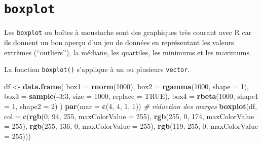\documentclass[
]{book}
\newenvironment{Shaded}{\begin{snugshade}}{\end{snugshade}}
\newcommand{\CommentTok}[1]{\textcolor[rgb]{0.56,0.35,0.01}{\textit{#1}}}
\newcommand{\DataTypeTok}[1]{\textcolor[rgb]{0.13,0.29,0.53}{#1}}
\newcommand{\DecValTok}[1]{\textcolor[rgb]{0.00,0.00,0.81}{#1}}
\newcommand{\KeywordTok}[1]{\textcolor[rgb]{0.13,0.29,0.53}{\textbf{#1}}}
\newcommand{\NormalTok}[1]{#1}
\newcommand{\OperatorTok}[1]{\textcolor[rgb]{0.81,0.36,0.00}{\textbf{#1}}}
\newcommand{\OtherTok}[1]{\textcolor[rgb]{0.56,0.35,0.01}{#1}}
\newcommand{\StringTok}[1]{\textcolor[rgb]{0.31,0.60,0.02}{#1}}
\begin{document}
\hypertarget{graph1boxplot}{%
\section{\texorpdfstring{\texttt{boxplot}}{boxplot}}\label{graph1boxplot}}

Les \texttt{boxplot} ou boîtes à moustache sont des graphiques très courant avec R car ils donnent un bon aperçu d'un jeu de données en représentant les valeurs extrêmes (``outliers''), la médiane, les quartiles, les minimums et les maximums.

La fonction \texttt{boxplot()} s'applique à un ou plusieurs \texttt{vector}.

\begin{Shaded}
\begin{Highlighting}[]
\NormalTok{df <-}\StringTok{ }\KeywordTok{data.frame}\NormalTok{(}
  \DataTypeTok{box1 =} \KeywordTok{rnorm}\NormalTok{(}\DecValTok{1000}\NormalTok{), }
  \DataTypeTok{box2 =} \KeywordTok{rgamma}\NormalTok{(}\DecValTok{1000}\NormalTok{, }\DataTypeTok{shape =} \DecValTok{1}\NormalTok{), }
  \DataTypeTok{box3 =} \KeywordTok{sample}\NormalTok{(}\OperatorTok{-}\DecValTok{3}\OperatorTok{:}\DecValTok{3}\NormalTok{, }\DataTypeTok{size =} \DecValTok{1000}\NormalTok{, }\DataTypeTok{replace =} \OtherTok{TRUE}\NormalTok{),}
  \DataTypeTok{box4 =} \KeywordTok{rbeta}\NormalTok{(}\DecValTok{1000}\NormalTok{, }\DataTypeTok{shape1 =} \DecValTok{1}\NormalTok{, }\DataTypeTok{shape2 =} \DecValTok{2}\NormalTok{)}
\NormalTok{)}
\KeywordTok{par}\NormalTok{(}\DataTypeTok{mar =} \KeywordTok{c}\NormalTok{(}\DecValTok{4}\NormalTok{, }\DecValTok{4}\NormalTok{, }\DecValTok{1}\NormalTok{, }\DecValTok{1}\NormalTok{)) }\CommentTok{# réduction des marges}
\KeywordTok{boxplot}\NormalTok{(df, }\DataTypeTok{col =} \KeywordTok{c}\NormalTok{(}\KeywordTok{rgb}\NormalTok{(}\DecValTok{0}\NormalTok{, }\DecValTok{94}\NormalTok{, }\DecValTok{255}\NormalTok{, }\DataTypeTok{maxColorValue =} \DecValTok{255}\NormalTok{),  }
  \KeywordTok{rgb}\NormalTok{(}\DecValTok{255}\NormalTok{, }\DecValTok{0}\NormalTok{, }\DecValTok{174}\NormalTok{, }\DataTypeTok{maxColorValue =} \DecValTok{255}\NormalTok{),  }
  \KeywordTok{rgb}\NormalTok{(}\DecValTok{255}\NormalTok{, }\DecValTok{136}\NormalTok{, }\DecValTok{0}\NormalTok{, }\DataTypeTok{maxColorValue =} \DecValTok{255}\NormalTok{),  }
  \KeywordTok{rgb}\NormalTok{(}\DecValTok{119}\NormalTok{, }\DecValTok{255}\NormalTok{, }\DecValTok{0}\NormalTok{, }\DataTypeTok{maxColorValue =} \DecValTok{255}\NormalTok{)))}
\end{Highlighting}
\end{Shaded}
\end{document}
